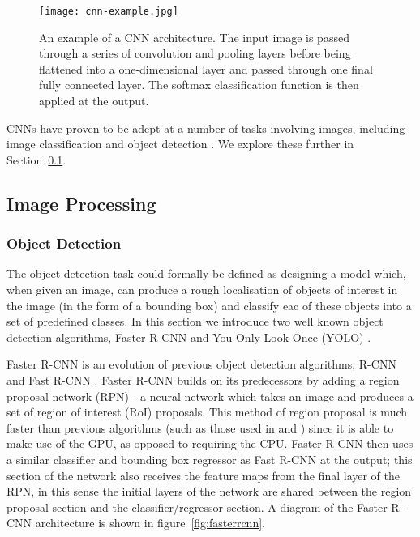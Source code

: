 \documentclass[../interim.tex]{subfiles}
\begin{document}
\begin{figure}
  \centering
  \texttt{[image: cnn-example.jpg]}
  \caption{An example of a CNN architecture. The input image is passed through a series of convolution and pooling layers before being flattened into a one-dimensional layer and passed through one final fully connected layer. The softmax classification function is then applied at the output.}
  \label{fig:example-cnn}
\end{figure}

CNNs have proven to be adept at a number of tasks involving images, including image classification \cite{cnn-uses:classification} and object detection \cite{cnn-uses:yolo-v3}\cite{cnn-uses:faster-r-cnn}. We explore these further in Section~\ref{section:image-proc}.


\subsection{Image Processing}
\label{section:image-proc}

\subsubsection{Object Detection}

The object detection task could formally be defined as designing a model which, when given an image, can produce a rough localisation of objects of interest in the image (in the form of a bounding box) and classify eac of these objects into a set of predefined classes. In this section we introduce two well known object detection algorithms, Faster R-CNN \cite{cnn-uses:faster-r-cnn} and You Only Look Once (YOLO) \cite{cnn-uses:yolo-v3}.

Faster R-CNN is an evolution of previous object detection algorithms, R-CNN \cite{r-cnn} and Fast R-CNN \cite{fast-r-cnn}. Faster R-CNN builds on its predecessors by adding a region proposal network (RPN) - a neural network which takes an image and produces a set of region of interest (RoI) proposals. This method of region proposal is much faster than previous algorithms (such as those used in \cite{r-cnn} and \cite{fast-r-cnn}) since it is able to make use of the GPU, as opposed to requiring the CPU. Faster R-CNN then uses a similar classifier and bounding box regressor as Fast R-CNN at the output; this section of the network also receives the feature maps from the final layer of the RPN, in this sense the initial layers of the network are shared between the region proposal section and the classifier/regressor section. A diagram of the Faster R-CNN architecture is shown in figure~\ref{fig:fasterrcnn}.
\end{document}
